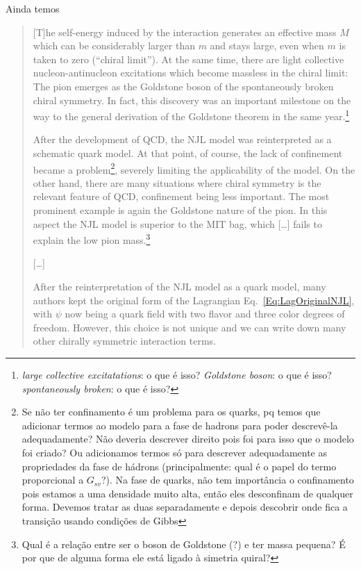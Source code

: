 Ainda temos\cite{Buballa}
\begin{quote}
[T]he self-energy induced by the interaction generates an effective mass $M$ which can be considerably larger than $m$ and stays large, even when $m$ is taken to zero (``chiral limit''). At the same time, there are light collective nucleon-antinucleon excitations which become massless in the chiral limit: The pion emerges as the Goldstone boson of the spontaneously broken chiral symmetry. In fact, this discovery was an important milestone on the way to the general derivation of the Goldstone theorem in the same year.\footnote{\emph{large collective excitatations}: o que é isso? \emph{Goldstone boson}: o que é isso? \emph{spontaneously broken}: o que é isso?}

After the development of QCD, the NJL model was reinterpreted as a schematic quark model. At that point, of course, the lack of confinement became a problem\footnote{Se não ter confinamento é um problema para os quarks, pq temos que adicionar termos ao modelo para a fase de hadrons para poder descrevê-la adequadamente? Não deveria descrever direito pois foi para isso que o modelo foi criado? Ou adicionamos termos só para descrever adequadamente as propriedades da fase de hádrons (principalmente: qual é o papel do termo proporcional a $G_{sv}$?). Na fase de quarks, não tem importância o confinamento pois estamos a uma densidade muito alta, então eles desconfinam de qualquer forma. Devemos tratar as duas separadamente e depois descobrir onde fica a transição usando condições de Gibbs}, severely limiting the applicability of the model. On the other hand, there are many situations where chiral symmetry is the relevant feature of QCD, confinement being less important. The most prominent example is again the Goldstone nature of the pion. In this aspect the NJL model is superior to the MIT bag, which [\dots] fails to explain the low pion mass.\footnote{Qual é a relação entre ser o boson de Goldstone (?) e ter massa pequena? É por que de alguma forma ele está ligado à simetria quiral?}

[\dots]

After the reinterpretation of the NJL model as a quark model, many authors kept the original form of the Lagrangian Eq.~\eqref{Eq:LagOriginalNJL}, with $\psi$ now being a quark field with two flavor and three color degrees of freedom. However, this choice is not unique and we can write down many other chirally symmetric interaction terms.
\end{quote}

